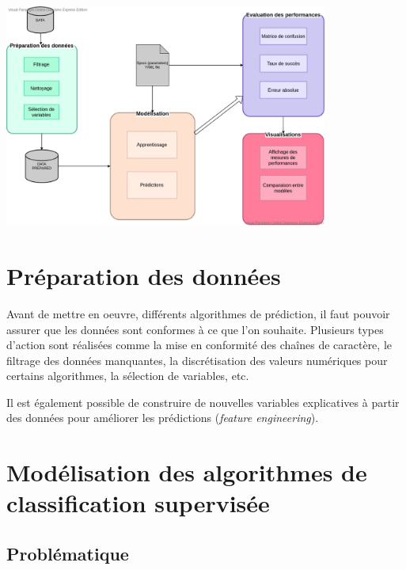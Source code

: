 \begin{center}
  \includegraphics[width=0.8\textwidth]{figures/Bloc_diagram.png}
  \label{fig2}
\end{center}

\section{Préparation des données}

Avant de mettre en oeuvre, différents algorithmes de prédiction, il faut pouvoir assurer que les données sont conformes à ce que l’on souhaite. Plusieurs types d’action sont réalisées comme la mise en conformité des chaînes de caractère, le filtrage des données manquantes, la discrétisation des valeurs numériques pour certains algorithmes, la sélection de variables, etc.

Il est également possible de construire de nouvelles variables explicatives à partir des données pour améliorer les prédictions (\textit{feature engineering}). 

\section{Modélisation des algorithmes de classification supervisée}

\subsection{Problématique}

